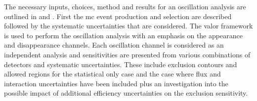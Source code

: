 The necessary inputs, choices, method and results for an oscillation analysis are outlined in  and . First the \gls{mc} event production and selection are described followed by the systematic uncertainties that are considered. The \gls{valor} framework is used to perform the oscillation analysis with an emphasis on the \nue appearance and \nue disappearance channels. Each oscillation channel is considered as an independent analysis and sensitivities are presented from various combinations of detectors and systematic uncertainties. These include exclusion contours and allowed regions for the statistical only case and the case where flux and interaction uncertainties have been included plus an investigation into the possible impact of additional efficiency uncertainties on the exclusion sensitivity. 